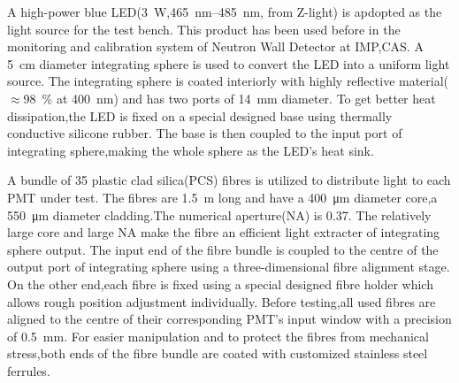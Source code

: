 \documentclass[preprint,5p,times]{elsarticle}
\begin{document}
A high-power blue LED(\SI{3}{\watt},\SIrange{465}{485}{\nano\meter}, from Z-light\cite{zlight}) is apdopted as the light source for the test bench.
This product has been used before in the monitoring and calibration system of Neutron Wall Detector at IMP,CAS\cite{yuyuhong_led}. 
A \SI{5}{\centi\meter} diameter integrating sphere is used to convert the LED into a uniform light source.
The integrating sphere is coated interiorly with highly reflective material($\approx$\SI{98}{\percent} at \SI{400}{\nano\meter}) and has two ports of \SI{14}{\milli\meter} diameter.
To get better heat dissipation,the LED is fixed on a special designed base using thermally conductive silicone rubber.
The base is then coupled to the input port of integrating sphere,making the whole sphere as the LED's heat sink.

A bundle of 35 plastic clad silica(PCS) fibres is utilized to distribute light to each PMT under test.
The fibres are \SI{1.5}{\meter} long and have a \SI{400}{\micro\meter} diameter core,a \SI{550}{\micro\meter} diameter cladding.The numerical aperture(NA) is 0.37.
The relatively large core and large NA make the fibre an efficient light extracter of integrating sphere output. 
The input end of the fibre bundle is coupled to the centre of the output port of integrating sphere using a three-dimensional fibre alignment stage.
On the other end,each fibre is fixed using a special designed fibre holder which allows rough position adjustment individually.
Before testing,all used fibres are aligned to the centre of their corresponding PMT's input window with a precision of \SI{0.5}{\milli\meter}.  
For easier manipulation and to protect the fibres from mechanical stress,both ends of the fibre bundle are coated with customized stainless steel ferrules.
\end{document}
